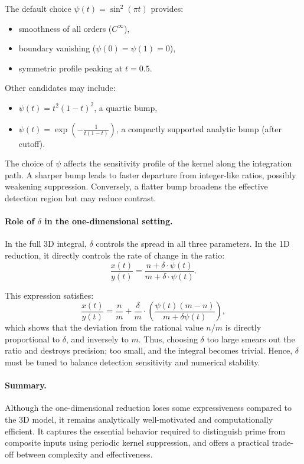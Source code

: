 \documentclass[12pt]{article}
\theoremstyle{definition}
\theoremstyle{plain}
\theoremstyle{remark}
\begin{document}
The default choice \( \psi(t) = \sin^2(\pi t) \) provides:
\begin{itemize}
  \item smoothness of all orders (\( C^\infty \)),
  \item boundary vanishing (\( \psi(0) = \psi(1) = 0 \)),
  \item symmetric profile peaking at \( t = 0.5 \).
\end{itemize}

Other candidates may include:
\begin{itemize}
  \item \( \psi(t) = t^2(1 - t)^2 \), a quartic bump,
  \item \( \psi(t) = \exp\left(-\frac{1}{t(1 - t)}\right) \), a compactly supported analytic bump (after cutoff).
\end{itemize}

The choice of \( \psi \) affects the sensitivity profile of the kernel along the integration path. A sharper bump leads to faster departure from integer-like ratios, possibly weakening suppression. Conversely, a flatter bump broadens the effective detection region but may reduce contrast.

\paragraph{Role of \( \delta \) in the one-dimensional setting.}

In the full 3D integral, \( \delta \) controls the spread in all three parameters. In the 1D reduction, it directly controls the rate of change in the ratio:
\[
\frac{x(t)}{y(t)} = \frac{n + \delta \cdot \psi(t)}{m + \delta \cdot \psi(t)}.
\]

This expression satisfies:
\[
\frac{x(t)}{y(t)} = \frac{n}{m} + \frac{\delta}{m} \cdot \left( \frac{\psi(t)(m - n)}{m + \delta \psi(t)} \right),
\]
which shows that the deviation from the rational value \( n/m \) is directly proportional to \( \delta \), and inversely to \( m \). Thus, choosing \( \delta \) too large smears out the ratio and destroys precision; too small, and the integral becomes trivial. Hence, \( \delta \) must be tuned to balance detection sensitivity and numerical stability.

\paragraph{Summary.}

Although the one-dimensional reduction loses some expressiveness compared to the 3D model, it remains analytically well-motivated and computationally efficient. It captures the essential behavior required to distinguish prime from composite inputs using periodic kernel suppression, and offers a practical trade-off between complexity and effectiveness.
\end{document}
